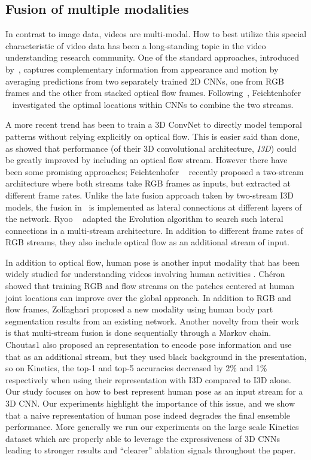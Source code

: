 \documentclass[10pt,twocolumn,letterpaper]{article}
\begin{document}
\subsection{Fusion of multiple modalities}
In contrast to image data, videos are multi-modal. How to best utilize this special characteristic of video data has been a long-standing topic in the video understanding research community. One of the standard approaches, introduced by~\cite{Simonyan2}, captures complementary information from appearance and motion by averaging predictions from two separately trained 2D CNNs, one from RGB frames and the other from stacked optical flow frames. Following~\cite{Simonyan2}, 
Feichtenhofer \etal~
\cite{feichtenhofer2016convolutional} investigated the optimal locations within CNNs to combine the two streams.

A more recent trend has been to train a 3D ConvNet to directly model temporal patterns without relying explicitly on optical flow. This is easier said than done, as \cite{carreira2017quo} showed  that performance (of their 3D convolutional architecture, \emph{I3D}) could  be greatly improved by including an optical flow stream. However there have been some promising approaches; Feichtenhofer \etal~ \cite{feichtenhofer2019slowfast} recently proposed a two-stream architecture where both streams take RGB frames as inputs, but extracted at different frame rates. Unlike the late fusion approach taken by two-stream I3D models, the fusion in~\cite{feichtenhofer2019slowfast} is implemented as lateral connections at different layers of the network. Ryoo \etal~ \cite{ryoo2019assemblenet} adapted the Evolution algorithm to search such lateral connections in a multi-stream architecture. In addition to different frame rates of RGB streams, they also include optical flow as an additional stream of input.

In addition to optical flow, human pose is another input modality that has been widely studied for understanding videos involving human activities \cite{xiaohan2015joint,luvizon20182d,iqbal2017pose}. Ch{\'e}ron \etal \cite{cheron2015p} showed that training RGB and flow streams on the patches centered at human joint locations can improve over the global approach. In addition to RGB and flow frames, Zolfaghari \etal \cite{zolfaghari2017chained} proposed a new modality using human body part segmentation results from an existing network. Another novelty from their work is that multi-stream fusion is done sequentially through a Markov chain. Choutas1 \etal \cite{potion2018} also proposed an representation to encode pose information and use that as an additional stream, but they used black background in the presentation, so on Kinetics, the top-1 and top-5 accuracies decreased by 2\% and 1\% respectively when using their representation with I3D compared to I3D alone.
Our study focuses on how to best represent human pose as an input stream for a 3D CNN. Our experiments highlight the importance of this issue, and we show that a naive representation of human pose indeed degrades the final ensemble performance. More generally we run our experiments on the large scale Kinetics dataset which are properly able to leverage the expressiveness of 3D CNNs leading to stronger results and ``clearer'' ablation signals throughout the paper.
\end{document}
